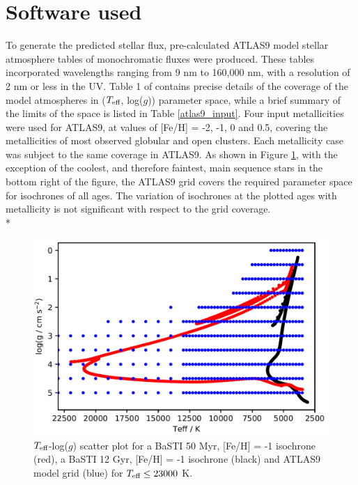 \documentclass[12pt, a4paper]{report}
\begin{document}
\section{Software used}
To generate the predicted stellar flux, pre-calculated ATLAS9 model stellar atmosphere \citep{1993KurCD..13.....K} tables of monochromatic fluxes were produced. These tables incorporated wavelengths ranging from 9 nm to 160,000 nm, with a resolution of 2 nm or less in the UV. Table 1 of \cite{2004astro.ph..5087C} contains precise details of the coverage of the model atmospheres in ($T_{\textnormal{eff}}$, log($g$)) parameter space, while a brief summary  of the limits of the space is listed in Table \ref{atlas9_input}. Four input metallicities were used for ATLAS9, at values of [Fe/H] = -2, -1, 0 and 0.5, covering the metallicities of most observed globular and open clusters. Each metallicity case was subject to the same coverage in ATLAS9. As shown in Figure \ref{Teff-logg coverage}, with the exception of the coolest, and therefore faintest, main sequence stars in the bottom right of the figure, the ATLAS9 grid covers the required parameter space for isochrones of all ages. The variation of isochrones at the plotted ages with metallicity is not significant with respect to the grid coverage. \\*

\begin{figure}[h]
\begin{center}
\includegraphics[scale=0.6]{ATLAS9_grid_BaSTI_coverage_2ages_crop.png}
\caption{$T_{\textnormal{eff}}$-log($g$) scatter plot for a BaSTI 50 Myr, [Fe/H] = -1 isochrone (red), a BaSTI 12 Gyr, [Fe/H] = -1 isochrone (black) and ATLAS9 model grid (blue) for $T_{\textnormal{eff}} \leq 23000$ K.}
\label{Teff-logg coverage}
\end{center}
\end{figure}
\end{document}
